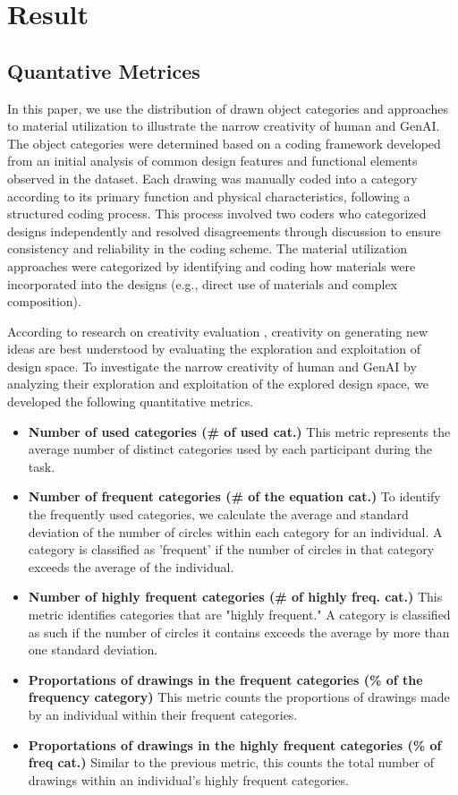 \section{Result}

\subsection{Quantative Metrices}
In this paper, we use the distribution of drawn object categories and approaches to material utilization to illustrate the narrow creativity of human and GenAI. The object categories were determined based on a coding framework developed from an initial analysis of common design features and functional elements observed in the dataset. Each drawing was manually coded into a category according to its primary function and physical characteristics, following a structured coding process. This process involved two coders who categorized designs independently and resolved disagreements through discussion to ensure consistency and reliability in the coding scheme. The material utilization approaches were categorized by identifying and coding how materials were incorporated into the designs (e.g., direct use of materials and complex composition).

According to research on creativity evaluation \cite{tromp2024creativity, knight2015managing,li2008exploration}, creativity on generating new ideas are best understood by evaluating the exploration and exploitation of design space. 
To investigate the narrow creativity of human and GenAI by analyzing their exploration and exploitation of the explored design space, we developed the following quantitative metrics. 

\begin{itemize}
  \item \textbf{Number of used categories (\# of used cat.)} This metric represents the average number of distinct categories used by each participant during the task.
  \item \textbf{Number of frequent categories (\# of the equation cat.)} To identify the frequently used categories, we calculate the average and standard deviation of the number of circles within each category for an individual. A category is classified as 'frequent' if the number of circles in that category exceeds the average of the individual.
  \item \textbf{Number of highly frequent categories (\# of highly freq. cat.)} This metric identifies categories that are "highly frequent." A category is classified as such if the number of circles it contains exceeds the average by more than one standard deviation.

  \item \textbf{Proportations of drawings in the frequent categories (\% of the frequency category)} This metric counts the proportions of drawings made by an individual within their frequent categories.
  \item \textbf{Proportations of drawings in the highly frequent categories (\% of freq cat.)} Similar to the previous metric, this counts the total number of drawings within an individual’s highly frequent categories.
\end{itemize}

